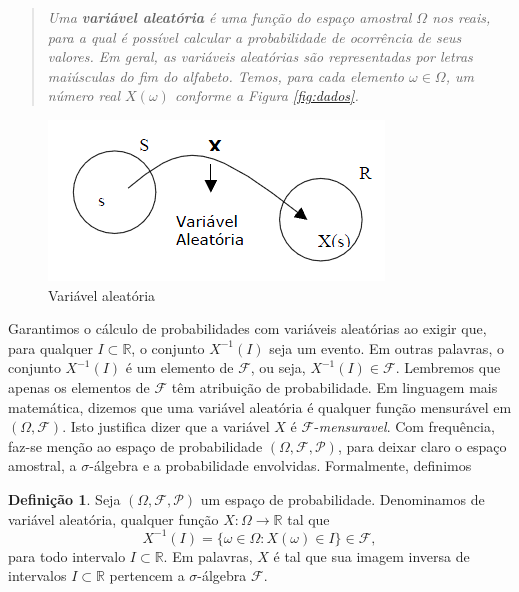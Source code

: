 \documentclass[
]{book}
\theoremstyle{definition}
\newtheorem{definition}{Definição}[chapter]
\theoremstyle{definition}
\theoremstyle{definition}
\theoremstyle{remark}
\begin{document}
\begin{quote}
\emph{Uma \textbf{variável aleatória} é uma função do espaço amostral
\(\Omega\) nos reais, para a qual é possível calcular a
probabilidade de ocorrência de seus valores. Em geral, as
variáveis aleatórias são representadas por letras maiúsculas do
fim do alfabeto. Temos, para cada elemento \(\omega \in \Omega\), um
número real \(X(\omega)\) conforme a Figura \ref{fig:dados}.}
\end{quote}

\begin{figure}

{\centering \includegraphics[width=0.33\linewidth]{Figuras/VA} 

}

\caption{Variável aleatória}\label{fig:va}
\end{figure}

Garantimos o cálculo de probabilidades com variáveis aleatórias ao exigir que, para qualquer \(I \subset \mathbb{R}\), o conjunto \(X^{-1}(I)\) seja um evento. Em outras palavras, o conjunto \(X^{-1}(I)\) é um
elemento de \(\mathcal{F}\), ou seja, \(X^{-1}(I) \in \mathcal{F}\). Lembremos que apenas os elementos de
\(\mathcal{F}\) têm atribuição de probabilidade. Em linguagem mais matemática, dizemos que uma variável aleatória é qualquer função mensurável em \((\Omega,\mathcal{F})\). Isto justifica dizer que a
variável \(X\) é \(\mathcal{F}\)-\emph{mensuravel}. Com frequência, faz-se menção ao espaço de probabilidade \((\Omega, \mathcal{F},\mathcal{P})\), para deixar claro o espaço amostral, a \(\sigma\)-álgebra e a probabilidade envolvidas. Formalmente, definimos

\begin{definition}
\protect\hypertarget{def:Def1}{}{\label{def:Def1} }Seja \((\Omega, \mathcal{F}, \mathcal{P})\) um espaço de
probabilidade. Denominamos de variável aleatória, qualquer função
\(X:\Omega \rightarrow \mathbb{R}\) tal que
\begin{equation*}
    X^{-1}(I)=\{\omega \in \Omega : X(\omega) \in I\} \in
    \mathcal{F},
\end{equation*}
para todo intervalo \(I \subset \mathbb{R}\). Em palavras, \(X\) é tal que sua
imagem inversa de intervalos \(I \subset \mathbb{R}\) pertencem a
\(\sigma\)-álgebra \(\mathcal{F}\).
\end{definition}
\end{document}
